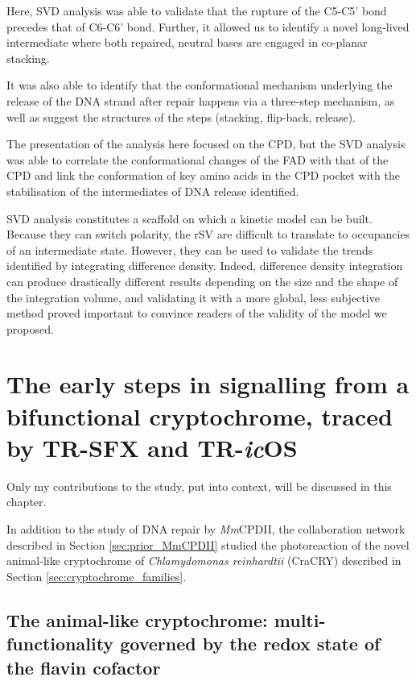 Here, SVD analysis was able to validate that the rupture of the C5-C5' bond precedes that of C6-C6' bond. Further, it allowed us to identify a novel long-lived intermediate where both repaired, neutral bases are engaged in co-planar stacking. 

It was also able to identify that the conformational mechanism underlying the release of the DNA strand after repair happens via a three-step mechanism, as well as suggest the structures of the steps (stacking, flip-back, release). 

The presentation of the analysis here focused on the CPD, but the SVD analysis was able to correlate the conformational changes of the FAD with that of the CPD and link the conformation of key amino acids in the CPD pocket with the stabilisation of the intermediates of DNA release identified. 

SVD analysis constitutes a scaffold on which a kinetic model can be built. Because they can switch polarity, the rSV are difficult to translate to occupancies of an intermediate state. However, they can be used to validate the trends identified by integrating difference density. Indeed, difference density integration can produce drastically different results depending on the size and the shape of the integration volume, and validating it with a more global, less subjective method proved important to convince readers of the validity of the model we proposed. 

\chapter{The early steps in signalling from a bifunctional cryptochrome, traced by TR-SFX and TR-\textit{ic}OS}\label{chap:CraCRY_TR-SFX_1}


\noindent  Only my contributions to the study, put into context, will be discussed in this chapter.
\vspace{10mm}

In addition to the study of DNA repair by \textit{Mm}CPDII, the collaboration network described in Section \ref{sec:prior_MmCPDII} studied the photoreaction of the novel animal-like cryptochrome of \textit{Chlamydomonas reinhardtii} (CraCRY) described in Section \ref{sec:cryptochrome_families}.

\section{The animal-like cryptochrome: multi-functionality governed by the redox state of the flavin cofactor}

